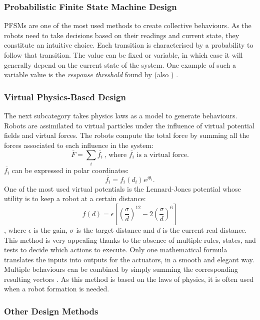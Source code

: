 \documentclass[a4paper, 12pt]{report}
\begin{document}
			\subsubsection{Probabilistic Finite State Machine Design}
			
			PFSMs \citep{minsky1967computation} are one of the most used methods to create collective behaviours. As the robots need to take decisions based on their readings and current state, they constitute an intuitive choice. Each transition is characterised by a probability to follow that transition. The value can be fixed or variable, in which case it will generally depend on the current state of the system. One example of such a variable value is the \emph{response threshold} found by \citet{granovetter1978threshold} (also \citet{bonabeau1997adaptive}) .
			
			\subsubsection{Virtual Physics-Based Design}
			\label{sec:virtual_physics}
			
			The next subcategory takes physics laws as a model to generate behaviours. Robots are assimilated to virtual particles under the influence of virtual potential fields and virtual forces. The robots compute the total force by summing all the forces associated to each influence in the system:
			$$\overline{F} = \sum_{i}{\overline{f_i}} ~\mbox{, where $\overline{f_i}$ is a virtual force.}$$
			$\overline{f_i}$ can be expressed in polar coordinates: $$\overline{f_i} = f_i(d_i)e^{j\theta_i}.$$ 
			One of the most used virtual potentials is the Lennard-Jones potential whose utility is to keep a robot at a certain distance: 
			$$ f(d) = \epsilon \left[ \left(\frac{\sigma}{d}\right)^{12} - 2 \left(\frac{\sigma}{d}\right)^6 \right]$$, where $\epsilon$ is the gain, $\sigma$ is the target distance and $d$ is the current real distance. 
			This method is very appealing thanks to the absence of multiple rules, states, and tests to decide which actions to execute. Only one mathematical formula translates the inputs into outputs for the actuators, in a smooth and elegant way. Multiple behaviours can be combined by simply summing the corresponding resulting vectors \citep{brambilla2013swarm}. As this method is based on the laws of physics, it is often used when a robot formation is needed.
			
			\subsubsection{Other Design Methods}
		
\end{document}
